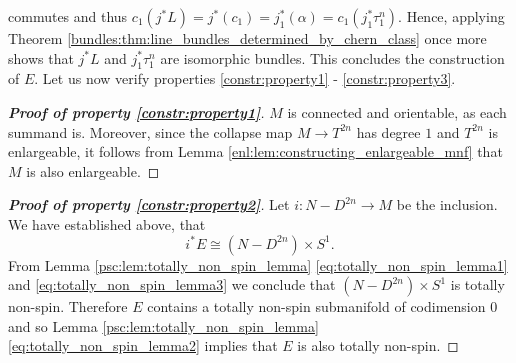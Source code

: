 commutes and thus $c_1(j^\ast L) = j^\ast(c_1) = j_1^\ast(\alpha) = c_1(j_1^\ast \tau_1^n)$. Hence, applying Theorem \ref{bundles:thm:line_bundles_determined_by_chern_class} once more shows that $j^\ast L$ and $j_1^\ast \tau_1^n$ are isomorphic bundles. This concludes the construction of $E$. Let us now verify properties \ref{constr:property1} - \ref{constr:property3}.



\begin{proof}[\normalfont\textbf{Proof of property \ref{constr:property1}}]
$M$ is connected and orientable, as each summand is. Moreover, since the collapse map $M \to T^{2n}$ has degree $1$ and $T^{2n}$ is enlargeable, it follows from Lemma \ref{enl:lem:constructing_enlargeable_mnf} that $M$ is also enlargeable. 
\end{proof}

\begin{proof}[\normalfont\textbf{Proof of property \ref{constr:property2}}]
Let $i \colon N - D^{2n} \to M$ be the inclusion. We have established above, that
\[
i^\ast E \cong (N- D^{2n}) \times S^1.
\]
From Lemma \ref{psc:lem:totally_non_spin_lemma} \ref{eq:totally_non_spin_lemma1} and \ref{eq:totally_non_spin_lemma3} we conclude that $(N- D^{2n}) \times S^1$ is totally non-spin. Therefore $E$ contains a totally non-spin submanifold of codimension $0$ and so Lemma \ref{psc:lem:totally_non_spin_lemma} \ref{eq:totally_non_spin_lemma2} implies that $E$ is also totally non-spin.
\end{proof}

